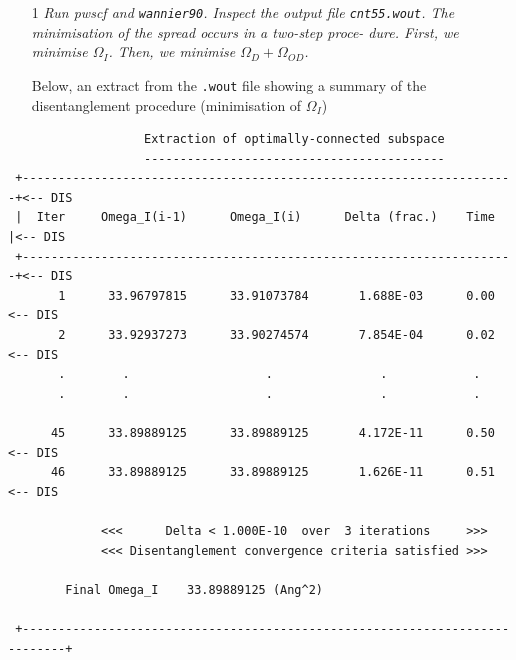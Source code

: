 \begin{itemize}
\item[1] {\it Run pwscf and {\tt wannier90}. Inspect the output file {\tt cnt55.wout}. The minimisation of the spread occurs in a two-step proce-
dure. First, we minimise $\Omega_I$. Then, we minimise $\Omega_D + \Omega_{OD}$.}

Below, an extract from the {\tt .wout} file showing a summary of the disentanglement procedure (minimisation of $\Omega_I$)
\end{itemize}
\begin{tcolorbox}[floatplacement=h!,float,nobeforeafter,sharp corners,boxrule=0.5pt]
\small{
	\begin{verbatim}
                   Extraction of optimally-connected subspace                  
                   ------------------------------------------                  
 +---------------------------------------------------------------------+<-- DIS
 |  Iter     Omega_I(i-1)      Omega_I(i)      Delta (frac.)    Time   |<-- DIS
 +---------------------------------------------------------------------+<-- DIS
       1      33.96797815      33.91073784       1.688E-03      0.00    <-- DIS
       2      33.92937273      33.90274574       7.854E-04      0.02    <-- DIS
       .		.					.				.			 .
       .		.					.				.			 .

      45      33.89889125      33.89889125       4.172E-11      0.50    <-- DIS
      46      33.89889125      33.89889125       1.626E-11      0.51    <-- DIS

             <<<      Delta < 1.000E-10  over  3 iterations     >>>
             <<< Disentanglement convergence criteria satisfied >>>

        Final Omega_I    33.89889125 (Ang^2)

 +----------------------------------------------------------------------------+
	\end{verbatim}
}
\end{tcolorbox}

